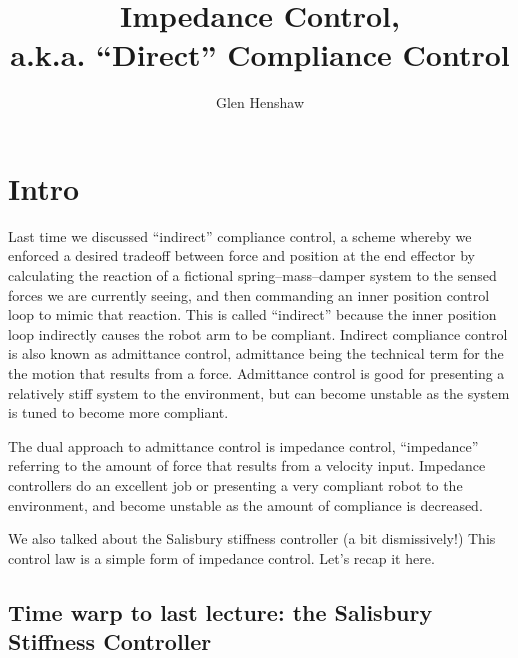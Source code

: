 \documentclass[]{article}
\title{Impedance Control,\\a.k.a. ``Direct'' Compliance Control}
\author{Glen Henshaw}
\begin{document}
\maketitle

\section{Intro}
Last time we discussed ``indirect'' compliance control, a scheme whereby we enforced a desired tradeoff between force and position at the end effector by calculating the reaction of a fictional spring--mass--damper system to the sensed forces we are currently seeing, and then commanding an inner position control loop to mimic that reaction. This is called ``indirect'' because the inner position loop indirectly causes the robot arm to be compliant. Indirect compliance control is also known as admittance control, admittance being the technical term for the the motion that results from a force. Admittance control is good for presenting a relatively stiff system to the environment, but can become unstable as the system is tuned to become more compliant.

The dual approach to admittance control is impedance control, ``impedance'' referring to the amount of force that results from a velocity input. Impedance controllers do an excellent job or presenting a very compliant robot to the environment, and become unstable as the amount of compliance is decreased.

We also talked about the Salisbury stiffness controller (a bit dismissively!) This control law is a simple form of impedance control. Let's recap it here.
\pagebreak

\subsection{Time warp to last lecture: the Salisbury Stiffness Controller}
\end{document}
